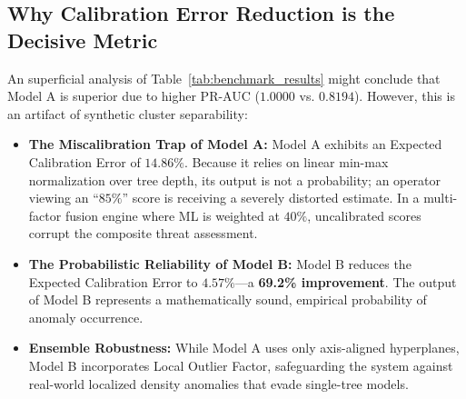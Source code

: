 \subsection{Why Calibration Error Reduction is the Decisive Metric}
An superficial analysis of Table~\ref{tab:benchmark_results} might conclude that Model A is superior due to higher PR-AUC ($1.0000$ vs. $0.8194$). However, this is an artifact of synthetic cluster separability:
\begin{itemize}[leftmargin=*]
    \item \textbf{The Miscalibration Trap of Model A:} Model A exhibits an Expected Calibration Error of $\mathbf{14.86\%}$. Because it relies on linear min-max normalization over tree depth, its output is not a probability; an operator viewing an ``$85\%$'' score is receiving a severely distorted estimate. In a multi-factor fusion engine where ML is weighted at $40\%$, uncalibrated scores corrupt the composite threat assessment.
    \item \textbf{The Probabilistic Reliability of Model B:} Model B reduces the Expected Calibration Error to $\mathbf{4.57\%}$—a \textbf{69.2\% improvement}. The output of Model B represents a mathematically sound, empirical probability of anomaly occurrence.
    \item \textbf{Ensemble Robustness:} While Model A uses only axis-aligned hyperplanes, Model B incorporates Local Outlier Factor, safeguarding the system against real-world localized density anomalies that evade single-tree models.
\end{itemize}
